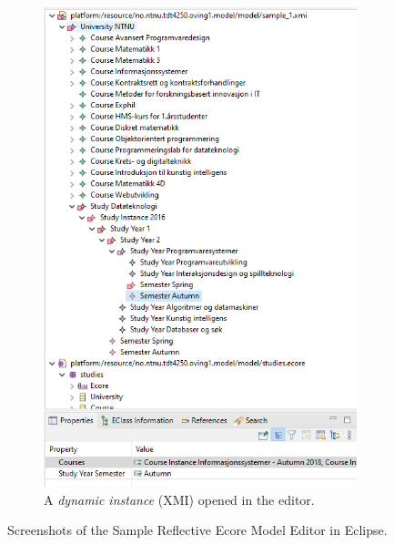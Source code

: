 \begin{figure}
\begin{subfigure}[b]{.45\textwidth}
        \includegraphics[width=\textwidth]{figures/ecore-sample-reflective-ecore-model-editor-instance.png}
        \caption{A \emph{dynamic instance} (\gls{XMI}) opened in the editor.}
        \label{sfig:sample-reflective-ecore-model-instance-screenshot}
    \end{subfigure}
    \caption{Screenshots of the Sample Reflective Ecore Model Editor in \gls{Eclipse}.}\label{fig:sample-reflective-ecore-model}
\end{figure}


